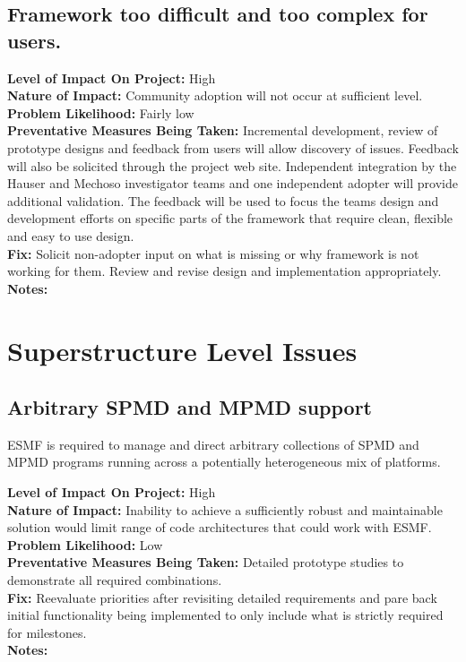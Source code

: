 \documentclass[english]{article}
\newcommand{\req}[1]{\section{\hspace{.2in}#1}}
\newcommand{\sreq}[1]{\subsection{\hspace{.2in}#1}}
\newenvironment
{reqlist}
{\begin{list} {} {} \rm \item[]}
{\end{list}}
\begin{document}
\sreq{Framework too difficult and too complex for users.}
\begin{reqlist}
{\bf Level of Impact On Project:}  High \\
{\bf Nature of Impact:} Community adoption will not occur at sufficient level.\\
{\bf Problem Likelihood:} Fairly low \\
{\bf Preventative Measures Being Taken:}
Incremental development, review of prototype designs and feedback from users
will allow discovery of issues. Feedback will also be solicited through the
project web site. Independent integration by the Hauser and Mechoso investigator
teams and one independent adopter will provide additional validation.
The feedback will be used to focus the teams design and development efforts on 
specific parts of the framework that require clean, flexible and easy to use design.
\\
{\bf Fix:} Solicit non-adopter input on what is missing or why framework is not working for them.
Review and revise design and implementation appropriately.\\
{\bf Notes:} \\
\end{reqlist}

\req{Superstructure Level Issues}
\sreq{Arbitrary SPMD and MPMD support}
ESMF is required to manage and direct arbitrary collections of SPMD and MPMD programs 
running across a potentially heterogeneous mix of platforms.
\begin{reqlist}
{\bf Level of Impact On Project:} High \\
{\bf Nature of Impact:} Inability to achieve a sufficiently robust and maintainable
solution would limit range of code architectures that could work with ESMF.\\
{\bf Problem Likelihood:} Low \\
{\bf Preventative Measures Being Taken:} Detailed prototype studies to demonstrate all required
combinations.\\
{\bf Fix:} Reevaluate priorities after revisiting detailed requirements and
pare back initial functionality being implemented to only include
what is strictly required for milestones.\\
{\bf Notes:}
\end{reqlist}
\end{document}
